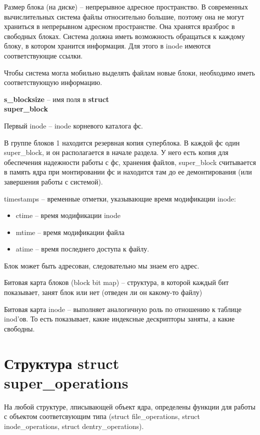 \par Размер блока (на диске) -- непрерывное адресное пространство. В современных вычислительных система файлы относительно большие, поэтому она не могут храниться в непрерывном адресном пространстве. Она хранятся вразброс в свободных блоках. Система должна иметь возможность обращаться к каждому блоку, в котором хранится информация. Для этого в inode имеются соответствующие ссылки.
\par Чтобы система могла мобильно выделять файлам новые блоки, необходимо иметь соответствующую информацию.
\par \textbf{s\_blocksize} -- имя поля в \textbf{struct \\ super\_block}
\par Первый inode -- inode корневого каталога фс.

В группе блоков 1 находится резервная копия суперблока. В каждой фс один super\_block, и он располагается в начале раздела. У него есть копия для обеспечения надежности работы с фс, хранения файлов, super\_block считывается в память ядра при монтировании фс и находится там до ее демонтирования (или завершения работы с системой).

timestamps -- временные отметки, указывающие время модификации inode: 
\begin{itemize}
\item ctime -- время модификации inode
\item mtime -- время модификации файла
\item atime -- время последнего доступа к файлу.
\end{itemize}

Блок может быть адресован, следовательно мы знаем его адрес.

Битовая карта блоков (block bit map) -- структура, в которой каждый бит показывает, занят блок или нет (отведен ли он какому-то файлу)

Битовая карта inode -- выполняет аналогичную роль по отношению к таблице inod'ов. То есть показывает, какие индексные дескрипторы заняты, а какие свободны.

\section{Структура struct \\ super\_operations}
На любой структуре, лписывающей объект ядра, определены функции для работы с объектом соответсвующим типа (struct file\_operations, struct \\ inode\_operations, struct dentry\_operations).

